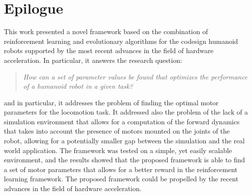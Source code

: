 \chapter*{Epilogue}
\label{chp:99-Epilogue}

This work presented a novel framework based on the combination of reinforcement learning and evolutionary algorithms for the codesign humanoid robots supported by the most recent advances in the field of hardware acceleration. In particular, it answers the research question:

\begin{quote}
    \textit{
        How can a set of parameter values be found that optimizes the performance of a humanoid robot in a given task?}
\end{quote}

and in particular, it addresses the problem of finding the optimal motor parameters for the locomotion task. It addressed also the problem of the lack of a simulation environment that allows for a computation of the forward dynamics that takes into account the presence of motors mounted on the joints of the robot, allowing for a potentially smaller gap between the simulation and the real world application.
The framework was tested on a simple, yet easily scalable environment, and the results showed that the proposed framework is able to find a set of motor parameters that allows for a better reward in the reinforcement learning framework.
The proposed framework could be propelled by the recent advances in the field of hardware acceleration.

